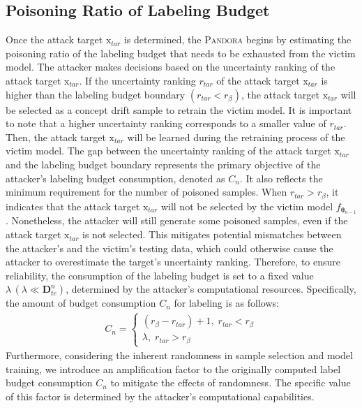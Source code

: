 \documentclass[lettersize,journal]{IEEEtran}
\newcommand{\pandora}{{\scshape Pandora}\xspace}
\begin{document}
\subsection{Poisoning Ratio of Labeling Budget}
\label{Sec: Surrogate Model Training}
Once the attack target $\bm{\mathrm{x}}_{tar}$ is determined, the \pandora begins by estimating the poisoning ratio of the labeling budget that needs to be exhausted from the victim model.
The attacker makes decisions based on the uncertainty ranking of the attack target $\bm{\mathrm{x}}_{tar}$.
If the uncertainty ranking $r_{tar}$ of the attack target $\bm{\mathrm{x}}_{tar}$ is higher than the labeling budget boundary $(r_{tar} < r_{\beta})$, the attack target $\bm{\mathrm{x}}_{tar}$ will be selected as a concept drift sample to retrain the victim model.
It is important to note that a higher uncertainty ranking corresponds to a smaller value of $r_{tar}$.
Then, the attack target $\bm{\mathrm{x}}_{tar}$ will be learned during the retraining process of the victim model.
The gap between the uncertainty ranking of the attack target $\bm{\mathrm{x}}_{tar}$ and the labeling budget boundary represents the primary objective of the attacker’s labeling budget consumption, denoted as $C_{n}$.
It also reflects the minimum requirement for the number of poisoned samples.
When $r_{tar} > r_{\beta}$, it indicates that the attack target $\bm{\mathrm{x}}_{tar}$ will not be selected by the victim model $f_{\bm{\theta}_{n-1}}$.
Nonetheless, the attacker will still generate some poisoned samples, even if the attack target $\bm{\mathrm{x}}_{tar}$ is not selected.
This mitigates potential mismatches between the attacker’s and the victim’s testing data, which could otherwise cause the attacker to overestimate the target’s uncertainty ranking.
Therefore, to ensure reliability, the consumption of the labeling budget is set to a fixed value $\lambda \, (\lambda \ll \bm{D}_{te}^{n})$, determined by the attacker’s computational resources.
Specifically, the amount of budget consumption $C_{n}$ for labeling is as follows:
\begin{align}
	C_{n} =
	\begin{cases} 
		(r_{\beta}-r_{tar}) + 1, \; r_{tar} < r_{\beta} \\
		\lambda , \; r_{tar} > r_{\beta}
	\end{cases}
\end{align}
Furthermore, considering the inherent randomness in sample selection and model training, we introduce an amplification factor to the originally computed label budget consumption $C_{n}$ to mitigate the effects of randomness.
The specific value of this factor is determined by the attacker's computational capabilities.
\end{document}
